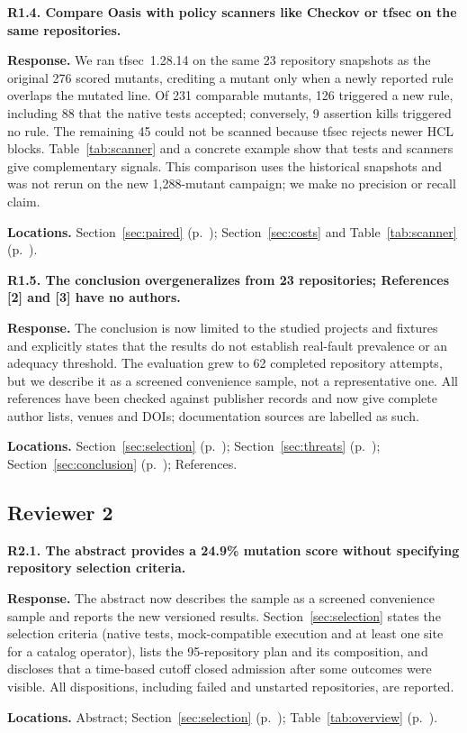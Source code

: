 \medskip
\noindent\textbf{R1.4. Compare Oasis with policy scanners like Checkov or tfsec on the same repositories.}\par
\textbf{Response.} We ran tfsec~1.28.14 on the same 23 repository snapshots as the original 276 scored mutants, crediting a mutant only when a newly reported rule overlaps the mutated line. Of 231 comparable mutants, 126 triggered a new rule, including 88 that the native tests accepted; conversely, 9 assertion kills triggered no rule. The remaining 45 could not be scanned because tfsec rejects newer HCL blocks. Table~\ref{tab:scanner} and a concrete example show that tests and scanners give complementary signals. This comparison uses the historical snapshots and was not rerun on the new 1,288-mutant campaign; we make no precision or recall claim.\par
\textbf{Locations.} Section~\ref{sec:paired} (p.~\pageref{sec:paired}); Section~\ref{sec:costs} and Table~\ref{tab:scanner} (p.~\pageref{tab:scanner}).

\medskip
\noindent\textbf{R1.5. The conclusion overgeneralizes from 23 repositories; References [2] and [3] have no authors.}\par
\textbf{Response.} The conclusion is now limited to the studied projects and fixtures and explicitly states that the results do not establish real-fault prevalence or an adequacy threshold. The evaluation grew to 62 completed repository attempts, but we describe it as a screened convenience sample, not a representative one. All references have been checked against publisher records and now give complete author lists, venues and DOIs; documentation sources are labelled as such.\par
\textbf{Locations.} Section~\ref{sec:selection} (p.~\pageref{sec:selection}); Section~\ref{sec:threats} (p.~\pageref{sec:threats}); Section~\ref{sec:conclusion} (p.~\pageref{sec:conclusion}); References.

\subsection*{Reviewer 2}
\noindent\textbf{R2.1. The abstract provides a 24.9\% mutation score without specifying repository selection criteria.}\par
\textbf{Response.} The abstract now describes the sample as a screened convenience sample and reports the new versioned results. Section~\ref{sec:selection} states the selection criteria (native tests, mock-compatible execution and at least one site for a catalog operator), lists the 95-repository plan and its composition, and discloses that a time-based cutoff closed admission after some outcomes were visible. All dispositions, including failed and unstarted repositories, are reported.\par
\textbf{Locations.} Abstract; Section~\ref{sec:selection} (p.~\pageref{sec:selection}); Table~\ref{tab:overview} (p.~\pageref{tab:overview}).

